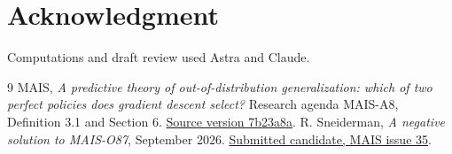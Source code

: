 \documentclass[11pt]{article}
\begin{document}
\section*{Acknowledgment}
Computations and draft review used Astra and Claude.

\begin{thebibliography}{9}
 MAIS, \emph{A predictive theory of out-of-distribution
generalization: which of two perfect policies does gradient descent select?}
Research agenda MAIS-A8, Definition 3.1 and Section 6.
\href{https://github.com/lionellevine/MAIS/blob/7b23a8a30c0eb0b1d3b55c592ca9554256fc4805/agendas/A8/MAIS-A8.tex}{Source version 7b23a8a}.
 R. Sneiderman, \emph{A negative solution to MAIS-O87},
September 2026. \href{https://github.com/lionellevine/MAIS/issues/35}{Submitted candidate, MAIS issue 35}.
\end{thebibliography}
\end{document}
